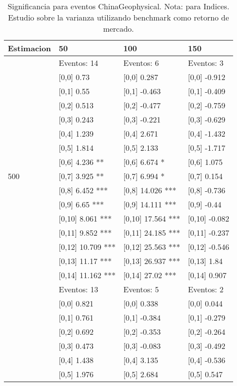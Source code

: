 \begin{table}

\caption{Significancia para eventos ChinaGeophysical. Nota: para Indices. Estudio sobre la varianza utilizando benchmark como retorno de mercado.}
\centering
\begin{tabular}[t]{llll}
\toprule
Estimacion & 50 & 100 & 150\\
\midrule
 & Eventos:  14 & Eventos:  6 & Eventos:  3\\
 & {}[0,0] 0.73 & {}[0,0] 0.287 & {}[0,0] -0.912\\
 & {}[0,1] 0.55 & {}[0,1] -0.463 & {}[0,1] -0.409\\
 & {}[0,2] 0.513 & {}[0,2] -0.477 & {}[0,2] -0.759\\
 & {}[0,3] 0.243 & {}[0,3] -0.221 & {}[0,3] -0.629\\
\addlinespace
 & {}[0,4] 1.239 & {}[0,4] 2.671 & {}[0,4] -1.432\\
 & {}[0,5] 1.814 & {}[0,5] 2.133 & {}[0,5] -1.717\\
 & {}[0,6] 4.236 ** & {}[0,6] 6.674 * & {}[0,6] 1.075\\
500 & {}[0,7] 3.925 ** & {}[0,7] 6.994 * & {}[0,7] 0.154\\
 & {}[0,8] 6.452 *** & {}[0,8] 14.026 *** & {}[0,8] -0.736\\
\addlinespace
 & {}[0,9] 6.65 *** & {}[0,9] 14.111 *** & {}[0,9] -0.44\\
 & {}[0,10] 8.061 *** & {}[0,10] 17.564 *** & {}[0,10] -0.082\\
 & {}[0,11] 9.852 *** & {}[0,11] 24.185 *** & {}[0,11] -0.237\\
 & {}[0,12] 10.709 *** & {}[0,12] 25.563 *** & {}[0,12] -0.546\\
 & {}[0,13] 11.17 *** & {}[0,13] 26.937 *** & {}[0,13] 1.84\\
\addlinespace
 & {}[0,14] 11.162 *** & {}[0,14] 27.02 *** & {}[0,14] 0.907\\
 & Eventos:  13 & Eventos:  5 & Eventos:  2\\
 & {}[0,0] 0.821 & {}[0,0] 0.338 & {}[0,0] 0.044\\
 & {}[0,1] 0.761 & {}[0,1] -0.384 & {}[0,1] -0.279\\
 & {}[0,2] 0.692 & {}[0,2] -0.353 & {}[0,2] -0.264\\
\addlinespace
 & {}[0,3] 0.473 & {}[0,3] -0.083 & {}[0,3] -0.492\\
 & {}[0,4] 1.438 & {}[0,4] 3.135 & {}[0,4] -0.536\\
 & {}[0,5] 1.976 & {}[0,5] 2.684 & {}[0,5] 0.547\\

\end{tabular}
\end{table}
